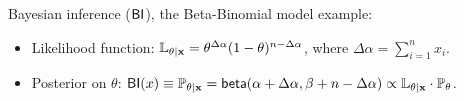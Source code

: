 \documentclass[final,hyperref={pdfpagelabels=false}]{beamer}
\begin{document}
\begin{frame}[t]
\begin{columns}[t]
\begin{column}{.485\textwidth}
\begin{block}{Bayesian inference ($\mathsf{BI}$), the Beta-Binomial model example:}
\begin{itemize}
  \item  Likelihood function: {\small $\mathbb{L}_{\theta|\textbf{x} }= \theta^{\Delta \alpha}(1-\theta)^{n - \Delta \alpha}$, where $\Delta \alpha = \displaystyle\sum_{i=1}^{n}x_i$.}

  \item Posterior on {\small $\theta$: $\mathsf{BI}(x)\equiv\mathbb{P}_{\theta|\textbf{x}}=\mathsf{beta}(\alpha + \Delta \alpha,\beta + n - \Delta \alpha)\propto\mathbb{L}_{\theta|\textbf{x} }\cdot \mathbb{P}_{\theta}$.}
\end{itemize}
\end{block}



\end{column}
\end{columns}
\end{frame}
\end{document}
